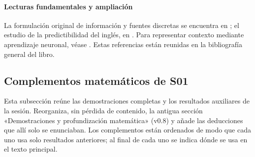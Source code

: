 \paragraph{Lecturas fundamentales y ampliación}
La formulación original de información y fuentes discretas se encuentra en
\citet{shannon1948}; el estudio de la predictibilidad del inglés, en
\citet{shannon1951}. Para representar contexto mediante aprendizaje neuronal,
véase \citet{bengio2003neural}. Estas referencias están reunidas en la
bibliografía general del libro.

\subsection{Complementos matemáticos de S01}\label{s01:comp}
Esta subsección reúne las demostraciones completas y los resultados auxiliares
de la sesión. Reorganiza, sin pérdida de contenido, la antigua sección
«Demostraciones y profundización matemática» (v0.8) y añade las deducciones que
allí solo se enunciaban. Los complementos están ordenados de modo que cada uno
usa solo resultados anteriores; al final de cada uno se indica dónde se usa en el
texto principal.

